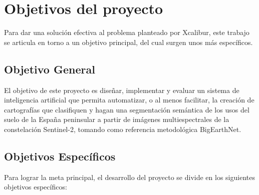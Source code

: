 \section{Objetivos del proyecto}
\label{sec:Objetivos}

Para dar una solución efectiva al problema planteado por Xcalibur, este trabajo se articula en torno a un objetivo principal, del cual surgen
unos más específicos.


\subsection{Objetivo General}

El objetivo de este proyecto es diseñar, implementar y evaluar un sistema de inteligencia artificial que permita automatizar, o al menos
facilitar, la creación de cartografías que clasifiquen y hagan una segmentación semántica de los usos del suelo de la España peninsular a partir
de imágenes multiespectrales de la constelación Sentinel-2, tomando como referencia metodológica BigEarthNet.

\subsection{Objetivos Específicos}
Para lograr la meta principal, el desarrollo del proyecto se divide en los siguientes objetivos específicos:

